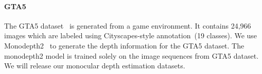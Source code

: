 \documentclass[10pt,twocolumn,letterpaper]{article}
\begin{document}
\paragraph{GTA5} The GTA5 dataset~\cite{richter2016playing} is generated from a game environment. It contains 24,966 images which are labeled using Cityscapes-style annotation~(19 classes). We use Monodepth2~\cite{monodepth2} to generate the depth information for the GTA5 dataset. The monodepth2 model is trained solely on the image sequences from GTA5 dataset. We will release our monocular depth estimation datasets.


\begin{table}[h]
\small
\centering
\caption{Ablation study of different components in our proposed framework on the SYNTHIA-to-Cityscapes adaptation task. Stereo depth estimation is used for the target data. mIoU* denotes performance over 13 classes excluding wall, fence, and pole as it is also widely used in the literature.}\label{tab:ablation}

\vspace{2mm}
\vspace{-3mm}
\end{table}
\end{document}
